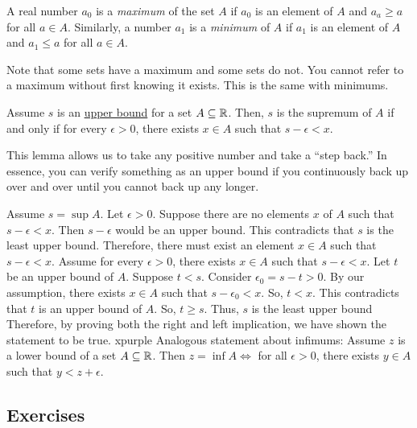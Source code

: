 \setcounter{BoxCounter}{3}

\begin{definition}
    A real number \(a_0\) is a \textit{maximum} of the set \(A\) if \(a_0\) is an element of \(A\) and \(a_a \geq a\) for all \(a \in A\). Similarly, a number \(a_1\) is a \textit{minimum} of \(A\) if \(a_1\) is an element of \(A\) and \(a_1 \leq a\) for all \(a \in A\).
\end{definition}

Note that some sets have a maximum and some sets do not. You cannot refer to a maximum without first knowing it exists. This is the same with minimums.

\begin{lemma}
    Assume \(s\) is an \hyperref[def:1.3.1]{upper bound} for a set \(A \subseteq \mathbb{R}\). Then, \(s\) is the supremum of \(A\) if and only if for every \(\epsilon > 0\), there exists \(x\in A\) such that \(s - \epsilon < x\).
\end{lemma}

This lemma allows us to take any positive number and take a ``step back.'' In essence, you can verify something as an upper bound if you continuously back up over and over until you cannot back up any longer.

\iffpf
{
    Assume \(s = \sup A\). Let \(\epsilon > 0\). Suppose there are no elements \(x\) of \(A\) such that \(s - \epsilon < x\). Then \(s - \epsilon\) would be an upper bound. This contradicts that \(s\) is the least upper bound. Therefore, there must exist an element \(x \in A\) such that \(s - \epsilon < x\).
}{
    Assume for every \(\epsilon > 0\), there exists \(x \in A\) such that \(s - \epsilon < x\). Let \(t\) be an upper bound of \(A\). Suppose \(t < s\). Consider \(\epsilon_0 = s - t > 0\). By our assumption, there exists \(x \in A\) such that \(s - \epsilon_0 < x\). So, \(t < x\). This contradicts that \(t\) is an upper bound of \(A\). So, \(t \geq s\). Thus, \(s\) is the least upper bound
}{
    Therefore, by proving both the right and left implication, we have shown the statement to be true.
}{xpurple}
Analogous statement about infimums: Assume \(z\) is a lower bound of a set \(A \subseteq \mathbb{R}\). Then \(z = \inf A \iff \) for all \( \epsilon >0\), there exists \(y \in A\) such that \(y < z + \epsilon\).

\renewcommand{\theenumi}{\alph{enumi}}
\renewcommand{\labelenumi}{(\theenumi)}
\subsection{Exercises}

